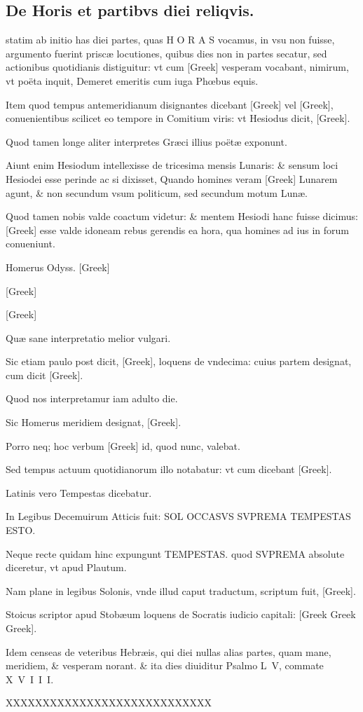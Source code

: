 \subsection[De Horis \& partibus diei reliquis.]{De Horis et partibvs diei reliqvis.}
\setcounter{parcount}{0}
\begin{parnumbers}

 statim ab initio has diei partes, quas H O R A S vocamus, in vsu non fuisse, argumento fuerint priscæ locutiones,  quibus dies non in partes secatur, sed actionibus quotidianis distiguitur: vt cum \textgreek{[Greek]} vesperam vocabant, nimirum, vt poëta inquit, Demeret emeritis cum iuga Phœbus equis.

Item quod tempus antemeridianum disignantes dicebant \textgreek{[Greek]} vel \textgreek{[Greek]}, conuenientibus scilicet eo tempore in Comitium viris: vt Hesiodus dicit, \textgreek{[Greek]}.

Quod tamen longe aliter interpretes Græci illius poëtæ exponunt.

Aiunt enim Hesiodum intellexisse de tricesima mensis Lunaris: \& sensum loci Hesiodei esse perinde ac si dixisset, Quando homines veram \textgreek{[Greek]} Lunarem agunt, \& non secundum vsum politicum, sed secundum motum Lunæ.

Quod  tamen nobis valde coactum videtur: \& mentem Hesiodi hanc fuisse dicimus: \textgreek{[Greek]} esse valde idoneam rebus gerendis ea hora, qua homines ad ius in forum conueniunt.

Homerus Odyss. \textgreek{[Greek]}

\textgreek{[Greek]}

\textgreek{[Greek]}

Quæ sane interpretatio melior vulgari.

Sic etiam paulo post dicit, \textgreek{[Greek]}, loquens de vndecima: cuius partem designat, cum dicit \textgreek{[Greek]}.

Quod nos interpretamur iam adulto die.

Sic Homerus meridiem designat, \textgreek{[Greek]}.

Porro neq; hoc verbum \textgreek{[Greek]} id, quod nunc, valebat.

Sed tempus actuum quotidianorum illo notabatur: vt cum dicebant \textgreek{[Greek]}.

 Latinis vero Tempestas dicebatur.

In Legibus Decemuirum Atticis fuit: SOL OCCASVS SVPREMA TEMPESTAS ESTO.

Neque recte quidam hinc expungunt TEMPESTAS. quod SVPREMA absolute diceretur, vt apud Plautum.

Nam plane in legibus Solonis, vnde illud caput traductum, scriptum fuit, \textgreek{[Greek]}.

Stoicus scriptor apud Stobæum loquens de Socratis iudicio capitali: [Greek Greek Greek].

Idem censeas de veteribus Hebræis,  qui diei nullas alias partes, quam mane, meridiem, \& vesperam norant. \& ita dies diuiditur Psalmo L V, commate X V I I I.

XXXXXXXXXXXXXXXXXXXXXXXXXXXX
\end{parnumbers}
